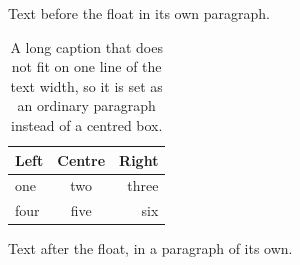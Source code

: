 \documentclass[10pt]{article}
\begin{document}
Text before the float in its own paragraph.

\begin{table}[h]
\centering
\begin{tabular}{lcr}\hline Left & Centre & Right\\\hline one & two & three\\ four & five & six\\\hline\end{tabular}
\caption{A long caption that does not fit on one line of the text width, so it is set as an ordinary paragraph instead of a centred box.}
\end{table}

Text after the float, in a paragraph of its own.
\end{document}
